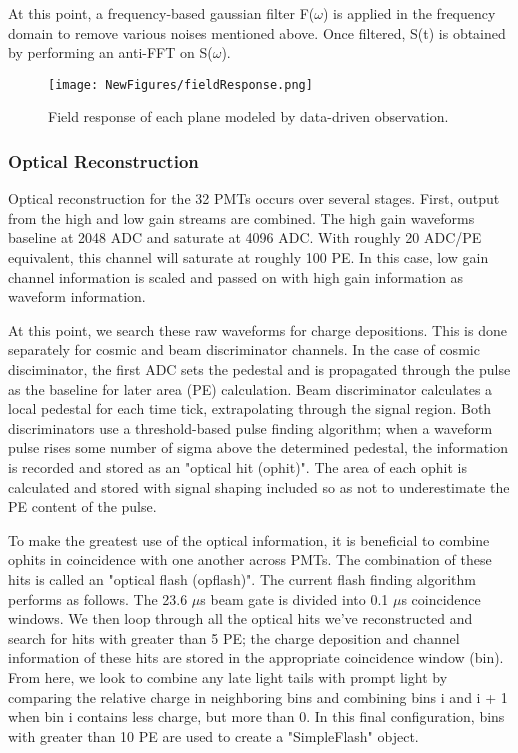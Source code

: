 \documentclass[12pt]{article}
\begin{document}
At this point, a frequency-based gaussian filter F($\omega$) is applied in the frequency domain to remove various noises mentioned above. Once filtered, S(t) is obtained by performing an anti-FFT on S($\omega$). 


\begin{figure}[h!]
\centering
\texttt{[image: NewFigures/fieldResponse.png]}
\caption{Field response of each plane modeled by data-driven observation. }
\label{fig:fieldResponse}
\end{figure}


\subsubsection{Optical Reconstruction} 
Optical reconstruction for the 32 PMTs occurs over several stages. First, output from the high and low gain streams are combined.  The high gain waveforms baseline at 2048 ADC and saturate at 4096 ADC.  With roughly 20 ADC/PE equivalent, this channel will saturate at roughly 100 PE.  In this case, low gain channel information is scaled and passed on with high gain information as waveform information. 
\par At this point, we search these raw waveforms for charge depositions.  This is done separately for cosmic and beam discriminator channels. In the case of cosmic disciminator, the first ADC sets the pedestal and is propagated through the pulse as the baseline for later area (PE) calculation. Beam discriminator calculates a local pedestal for each time tick, extrapolating through the signal region. Both discriminators use a threshold-based pulse finding algorithm; when a waveform pulse rises some number of sigma above the determined pedestal, the information is recorded and stored as an "optical hit (ophit)".  The area of each ophit is calculated and stored with signal shaping included so as not to underestimate the PE content of the pulse.
\par To make the greatest use of the optical information, it is beneficial to combine ophits in coincidence with one another across PMTs.  The combination of these hits is called an "optical flash (opflash)".  The current flash finding algorithm performs as follows. The 23.6 $\mu$s beam gate is divided into 0.1 $\mu$s coincidence windows. We then loop through all the optical hits we've reconstructed and search for hits with greater than 5 PE; the charge deposition and channel information of these hits are stored in the appropriate coincidence window (bin).  From here, we look to combine any late light tails with prompt light by comparing the relative charge in neighboring bins and combining bins i and i + 1 when bin i contains less charge, but more than 0.  In this final configuration, bins with greater than 10 PE are used to create a "SimpleFlash" object.
\end{document}
